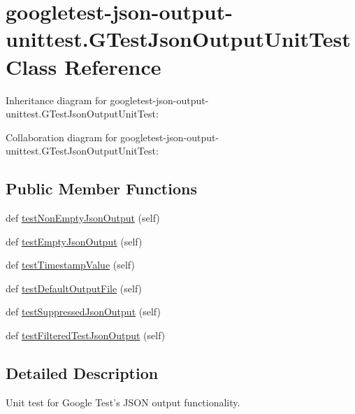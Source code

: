 \hypertarget{classgoogletest-json-output-unittest_1_1GTestJsonOutputUnitTest}{}\section{googletest-\/json-\/output-\/unittest.G\+Test\+Json\+Output\+Unit\+Test Class Reference}
\label{classgoogletest-json-output-unittest_1_1GTestJsonOutputUnitTest}


Inheritance diagram for googletest-\/json-\/output-\/unittest.G\+Test\+Json\+Output\+Unit\+Test\+:


Collaboration diagram for googletest-\/json-\/output-\/unittest.G\+Test\+Json\+Output\+Unit\+Test\+:
\subsection*{Public Member Functions}
\begin{DoxyCompactItemize}
\item 
def \hyperlink{classgoogletest-json-output-unittest_1_1GTestJsonOutputUnitTest_ab5520f22133356e62a54cdb5756504bc}{test\+Non\+Empty\+Json\+Output} (self)
\item 
def \hyperlink{classgoogletest-json-output-unittest_1_1GTestJsonOutputUnitTest_ad8f3712a87e4c54bb475103793975482}{test\+Empty\+Json\+Output} (self)
\item 
def \hyperlink{classgoogletest-json-output-unittest_1_1GTestJsonOutputUnitTest_afceaa6545170996b286e610e31f2e403}{test\+Timestamp\+Value} (self)
\item 
def \hyperlink{classgoogletest-json-output-unittest_1_1GTestJsonOutputUnitTest_a6003d1c583fc2ded1ab5276fc82cb1c9}{test\+Default\+Output\+File} (self)
\item 
def \hyperlink{classgoogletest-json-output-unittest_1_1GTestJsonOutputUnitTest_aeae00520b90ff69e832cf6a676219cf8}{test\+Suppressed\+Json\+Output} (self)
\item 
def \hyperlink{classgoogletest-json-output-unittest_1_1GTestJsonOutputUnitTest_abc55ae0ca4d9b3d265b10bbbcc6e720e}{test\+Filtered\+Test\+Json\+Output} (self)
\end{DoxyCompactItemize}


\subsection{Detailed Description}
\begin{DoxyVerb}Unit test for Google Test's JSON output functionality.
\end{DoxyVerb}
 

